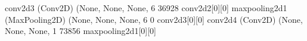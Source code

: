 \documentclass[letterpaper,10pt,english]{sphinxmanual}
\begin{document}
\begin{sphinxVerbatim}[commandchars=\\\{\}]
conv2d\PYGZus{}3 (Conv2D)               (None, None, None, 6 36928       conv2d\PYGZus{}2[0][0]                   
\PYGZus{}\PYGZus{}\PYGZus{}\PYGZus{}\PYGZus{}\PYGZus{}\PYGZus{}\PYGZus{}\PYGZus{}\PYGZus{}\PYGZus{}\PYGZus{}\PYGZus{}\PYGZus{}\PYGZus{}\PYGZus{}\PYGZus{}\PYGZus{}\PYGZus{}\PYGZus{}\PYGZus{}\PYGZus{}\PYGZus{}\PYGZus{}\PYGZus{}\PYGZus{}\PYGZus{}\PYGZus{}\PYGZus{}\PYGZus{}\PYGZus{}\PYGZus{}\PYGZus{}\PYGZus{}\PYGZus{}\PYGZus{}\PYGZus{}\PYGZus{}\PYGZus{}\PYGZus{}\PYGZus{}\PYGZus{}\PYGZus{}\PYGZus{}\PYGZus{}\PYGZus{}\PYGZus{}\PYGZus{}\PYGZus{}\PYGZus{}\PYGZus{}\PYGZus{}\PYGZus{}\PYGZus{}\PYGZus{}\PYGZus{}\PYGZus{}\PYGZus{}\PYGZus{}\PYGZus{}\PYGZus{}\PYGZus{}\PYGZus{}\PYGZus{}\PYGZus{}\PYGZus{}\PYGZus{}\PYGZus{}\PYGZus{}\PYGZus{}\PYGZus{}\PYGZus{}\PYGZus{}\PYGZus{}\PYGZus{}\PYGZus{}\PYGZus{}\PYGZus{}\PYGZus{}\PYGZus{}\PYGZus{}\PYGZus{}\PYGZus{}\PYGZus{}\PYGZus{}\PYGZus{}\PYGZus{}\PYGZus{}\PYGZus{}\PYGZus{}\PYGZus{}\PYGZus{}\PYGZus{}\PYGZus{}\PYGZus{}\PYGZus{}\PYGZus{}\PYGZus{}
max\PYGZus{}pooling2d\PYGZus{}1 (MaxPooling2D)  (None, None, None, 6 0           conv2d\PYGZus{}3[0][0]                   
\PYGZus{}\PYGZus{}\PYGZus{}\PYGZus{}\PYGZus{}\PYGZus{}\PYGZus{}\PYGZus{}\PYGZus{}\PYGZus{}\PYGZus{}\PYGZus{}\PYGZus{}\PYGZus{}\PYGZus{}\PYGZus{}\PYGZus{}\PYGZus{}\PYGZus{}\PYGZus{}\PYGZus{}\PYGZus{}\PYGZus{}\PYGZus{}\PYGZus{}\PYGZus{}\PYGZus{}\PYGZus{}\PYGZus{}\PYGZus{}\PYGZus{}\PYGZus{}\PYGZus{}\PYGZus{}\PYGZus{}\PYGZus{}\PYGZus{}\PYGZus{}\PYGZus{}\PYGZus{}\PYGZus{}\PYGZus{}\PYGZus{}\PYGZus{}\PYGZus{}\PYGZus{}\PYGZus{}\PYGZus{}\PYGZus{}\PYGZus{}\PYGZus{}\PYGZus{}\PYGZus{}\PYGZus{}\PYGZus{}\PYGZus{}\PYGZus{}\PYGZus{}\PYGZus{}\PYGZus{}\PYGZus{}\PYGZus{}\PYGZus{}\PYGZus{}\PYGZus{}\PYGZus{}\PYGZus{}\PYGZus{}\PYGZus{}\PYGZus{}\PYGZus{}\PYGZus{}\PYGZus{}\PYGZus{}\PYGZus{}\PYGZus{}\PYGZus{}\PYGZus{}\PYGZus{}\PYGZus{}\PYGZus{}\PYGZus{}\PYGZus{}\PYGZus{}\PYGZus{}\PYGZus{}\PYGZus{}\PYGZus{}\PYGZus{}\PYGZus{}\PYGZus{}\PYGZus{}\PYGZus{}\PYGZus{}\PYGZus{}\PYGZus{}\PYGZus{}\PYGZus{}
conv2d\PYGZus{}4 (Conv2D)               (None, None, None, 1 73856       max\PYGZus{}pooling2d\PYGZus{}1[0][0]            
\PYGZus{}\PYGZus{}\PYGZus{}\PYGZus{}\PYGZus{}\PYGZus{}\PYGZus{}\PYGZus{}\PYGZus{}\PYGZus{}\PYGZus{}\PYGZus{}\PYGZus{}\PYGZus{}\PYGZus{}\PYGZus{}\PYGZus{}\PYGZus{}\PYGZus{}\PYGZus{}\PYGZus{}\PYGZus{}\PYGZus{}\PYGZus{}\PYGZus{}\PYGZus{}\PYGZus{}\PYGZus{}\PYGZus{}\PYGZus{}\PYGZus{}\PYGZus{}\PYGZus{}\PYGZus{}\PYGZus{}\PYGZus{}\PYGZus{}\PYGZus{}\PYGZus{}\PYGZus{}\PYGZus{}\PYGZus{}\PYGZus{}\PYGZus{}\PYGZus{}\PYGZus{}\PYGZus{}\PYGZus{}\PYGZus{}\PYGZus{}\PYGZus{}\PYGZus{}\PYGZus{}\PYGZus{}\PYGZus{}\PYGZus{}\PYGZus{}\PYGZus{}\PYGZus{}\PYGZus{}\PYGZus{}\PYGZus{}\PYGZus{}\PYGZus{}\PYGZus{}\PYGZus{}\PYGZus{}\PYGZus{}\PYGZus{}\PYGZus{}\PYGZus{}\PYGZus{}\PYGZus{}\PYGZus{}\PYGZus{}\PYGZus{}\PYGZus{}\PYGZus{}\PYGZus{}\PYGZus{}\PYGZus{}\PYGZus{}\PYGZus{}\PYGZus{}\PYGZus{}\PYGZus{}\PYGZus{}\PYGZus{}\PYGZus{}\PYGZus{}\PYGZus{}\PYGZus{}\PYGZus{}\PYGZus{}\PYGZus{}\PYGZus{}\PYGZus{}\PYGZus{}

\end{sphinxVerbatim}
\end{document}
